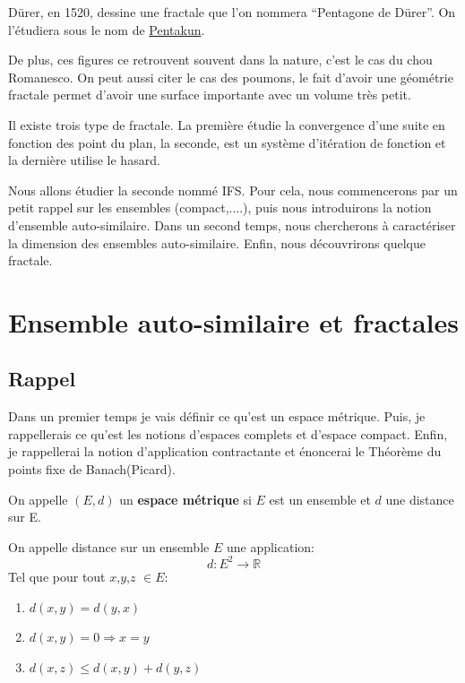 \documentclass[a4paper, 12pt]{report}
\begin{document}
		\hspace{.7 cm} Dürer, en 1520, dessine une fractale que l'on nommera ``Pentagone de Dürer''. On l'étudiera sous le nom de \hyperref[Pentakun]{Pentakun}. 
		
		
		\hspace{.7 cm} De plus,  ces figures ce retrouvent souvent dans la nature,  c'est le cas du chou Romanesco. On peut aussi citer le cas des poumons, le fait d'avoir une géométrie fractale permet d'avoir une surface importante avec un volume très petit.
		
		\hspace{.7 cm} Il existe trois type de fractale. La première étudie la convergence d'une suite en fonction des point du plan, la seconde, est un système d'itération de fonction et la dernière utilise le hasard.
		
		\hspace{.7 cm}Nous allons étudier la seconde nommé IFS. Pour cela, nous commencerons par un petit rappel sur les ensembles (compact,....), puis nous introduirons la notion d'ensemble auto-similaire. Dans un second temps, nous chercherons à caractériser la dimension des ensembles auto-similaire. Enfin, nous découvrirons quelque fractale.	
	
	\chapter{\bf Ensemble auto-similaire et fractales}
		\section{Rappel}
			Dans un premier temps je vais définir ce qu'est un espace métrique. Puis, je rappellerais ce qu'est les notions d'espaces complets et d'espace compact. Enfin, je rappellerai la notion d'application contractante et énoncerai le Théorème du points fixe de Banach(Picard).
			
			\begin{definition}
				On appelle $(E,d)$ un \textbf{espace métrique} si $E$ est un ensemble et $d$ une distance sur E.
				
				On appelle distance sur un ensemble $E$ une application:
				\begin{equation*}
					d:E^2\longrightarrow \mathds{R}
				\end{equation*}
			Tel que pour tout $x$,$y$,$z$ $\in E$:
				\begin{enumerate}\itemsep2pt
					\item $d(x,y)=d(y,x)$
					\item $d(x,y)=0 \Longrightarrow x=y$
					\item $d(x,z) \leq d(x,y)+d(y,z)$
				\end{enumerate}
			\end{definition}
			
\end{document}
